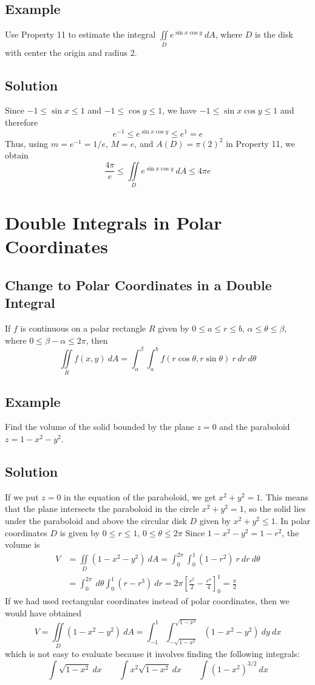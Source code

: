 \subsection*{Example}
Use Property 11 to estimate the integral $\iint\limits_D e^{\sin{x}\cos{y}}\:dA$,
where $D$ is the disk with center the origin and radius 2.

\subsection*{Solution}
Since $-1\leq\sin{x}\leq 1$ and $-1\leq \cos{y}\leq 1$, we have $-1\leq\sin{x}\cos{y}\leq 1$
and therefore
$$e^{-1}\leq e^{\sin{x}\cos{y}}\leq e^1=e$$
Thus, using $m=e^{-1}=1/e$, $M=e$, and $A(D)=\pi(2)^2$ in Property 11, we obtain
$$\frac{4\pi}{e}\leq\iint\limits_D e^{\sin{x}\cos{y}}\:dA\leq 4\pi e$$

\section{Double Integrals in Polar Coordinates}

\subsection*{Change to Polar Coordinates in a Double Integral}
If $f$ is continuous on a polar rectangle $R$ given by $0\leq a\leq r\leq b$,
$\alpha\leq\theta\leq\beta$, where $0\leq\beta-\alpha\leq 2\pi$, then
$$\iint\limits_R f(x,y)\:dA=\int_\alpha^\beta\int_a^b f(r\cos{\theta},r\sin{\theta})\:r\:dr\:d\theta$$

\subsection*{Example}
Find the volume of the solid bounded by the plane $z=0$ and the paraboloid $z=1-x^2-y^2$.

\subsection*{Solution}
If we put $z=0$ in the equation of the paraboloid, we get $x^2+y^2=1$. This means that
the plane intersects the paraboloid in the circle $x^2+y^2=1$, so the solid lies under
the paraboloid and above the circular disk $D$ given by $x^2+y^2\leq 1$. In polar
coordinates $D$ is given by $0\leq r\leq 1$, $0\leq\theta\leq 2\pi$ Since
$1-x^2-y^2=1-r^2$, the volume is
\begin{align*}
    V & =\iint\limits_D (1-x^2-y^2)\:dA=\int_0^{2\pi}\int_0^1 (1-r^2)\:r\:dr\:d\theta                             \\
      & =\int_0^{2\pi}\:d\theta\int_0^1(r-r^3)\:dr=2\pi\left[\frac{r^2}{2}-\frac{r^4}{4}\right]_0^1=\frac{\pi}{2}
\end{align*}
If we had used rectangular coordinates instead of polar coordinates, then we would have obtained
$$V=\iint\limits_D(1-x^2-y^2)\:dA=\int_{-1}^1\int_{-\sqrt{1-x^2}}^{\sqrt{1-x^2}}
    (1-x^2-y^2)\:dy\:dx$$
which is not easy to evaluate because it involves finding the following integrals:
$$\int\sqrt{1-x^2}\:dx \qquad \int x^2\sqrt{1-x^2}\:dx \qquad \int(1-x^2)^{3/2}\:dx$$

